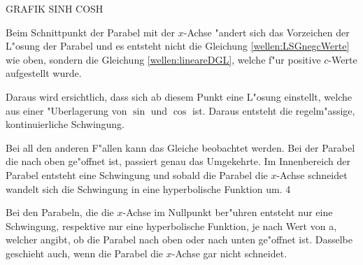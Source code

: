 GRAFIK SINH COSH

Beim Schnittpunkt der Parabel mit der $x$-Achse "andert sich das Vorzeichen der 
L"osung der Parabel und es entsteht nicht die Gleichung 
\ref{wellen:LSGnegcWerte} wie oben, sondern die Gleichung 
\ref{wellen:lineareDGL}, welche f"ur positive $c$-Werte aufgestellt wurde. 

Daraus wird ersichtlich, dass sich ab diesem Punkt eine L"osung einstellt, 
welche aus einer "Uberlagerung von $\sin$ und $\cos$ ist. Daraus entsteht die 
regelm"assige, kontinuierliche Schwingung. 


Bei all den anderen F"allen kann das Gleiche beobachtet werden. Bei der Parabel 
die nach oben ge"offnet ist, passiert genau das Umgekehrte. Im Innenbereich der 
Parabel entsteht eine Schwingung und sobald die Parabel die $x$-Achse schneidet 
wandelt sich die Schwingung in eine hyperbolische Funktion um. 4

Bei den Parabeln, die die $x$-Achse im Nullpunkt ber"uhren entsteht nur eine 
Schwingung, respektive nur eine hyperbolische Funktion, je nach Wert von a, 
welcher angibt, ob die Parabel nach oben oder nach unten ge"offnet ist. 
Dasselbe geschieht auch, wenn die Parabel die $x$-Achse gar nicht schneidet. 